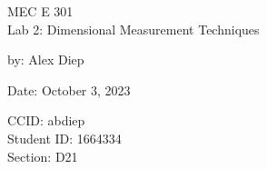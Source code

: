 \documentclass[letterpaper,12pt]{article} %
\begin{document}
\begin{titlepage}
    \centering
    \vspace*{2cm} %
    
    \Huge {MEC E 301 \\Lab 2: Dimensional Measurement Techniques} \\
    \vspace{1cm} %
    
    \Large by: Alex Diep \\
    \vspace{1cm} %

    \Large Date: October 3, 2023 \\ %
    \vspace{4cm} %

    \normalsize CCID: abdiep \\
    \normalsize Student ID: 1664334 \\ 
    \normalsize Section: D21 \\
    
    \vfill %
    
    
\end{titlepage}
\renewcommand\arraystretch{1.5}

{
    \hypersetup{hidelinks}
    \tableofcontents
}

\newpage








\newpage
\appendix

\newpage

\newpage

\newpage

\newpage

\end{document}
